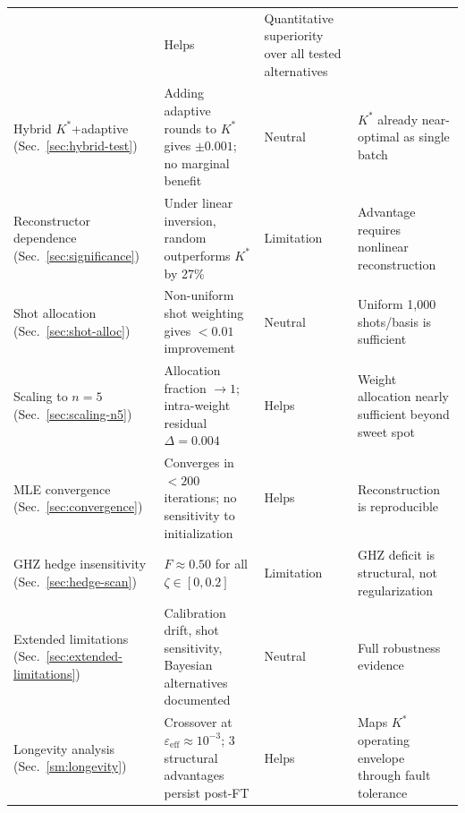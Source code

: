 \documentclass[twocolumn,prx,aps,superscriptaddress,longbibliography]{revtex4-2}
\begin{document}
\begin{table}
\begin{ruledtabular}
\begin{tabular}{p{}p{}lp{}}
  & Helps & Quantitative superiority over all tested alternatives \\
Hybrid $K^*$+adaptive (Sec.~\ref{sec:hybrid-test})
  & Adding adaptive rounds to $K^*$ gives $\pm 0.001$; no marginal benefit
  & Neutral & $K^*$ already near-optimal as single batch \\
Reconstructor dependence (Sec.~\ref{sec:significance})
  & Under linear inversion, random outperforms $K^*$ by 27\%
  & Limitation & Advantage requires nonlinear reconstruction \\
Shot allocation (Sec.~\ref{sec:shot-alloc})
  & Non-uniform shot weighting gives $< 0.01$ improvement
  & Neutral & Uniform 1{,}000 shots/basis is sufficient \\
Scaling to $n = 5$ (Sec.~\ref{sec:scaling-n5})
  & Allocation fraction $\to 1$; intra-weight residual $\Delta = 0.004$
  & Helps & Weight allocation nearly sufficient beyond sweet spot \\
MLE convergence (Sec.~\ref{sec:convergence})
  & Converges in $< 200$ iterations; no sensitivity to initialization
  & Helps & Reconstruction is reproducible \\
GHZ hedge insensitivity (Sec.~\ref{sec:hedge-scan})
  & $F \approx 0.50$ for all $\zeta \in [0, 0.2]$
  & Limitation & GHZ deficit is structural, not regularization \\
Extended limitations (Sec.~\ref{sec:extended-limitations})
  & Calibration drift, shot sensitivity, Bayesian alternatives documented
  & Neutral & Full robustness evidence \\
Longevity analysis (Sec.~\ref{sm:longevity})
  & Crossover at $\varepsilon_{\mathrm{eff}} \approx 10^{-3}$; 3 structural advantages persist post-FT
  & Helps & Maps $K^*$ operating envelope through fault tolerance \\
\end{tabular}
\end{ruledtabular}
\end{table}
\end{document}
